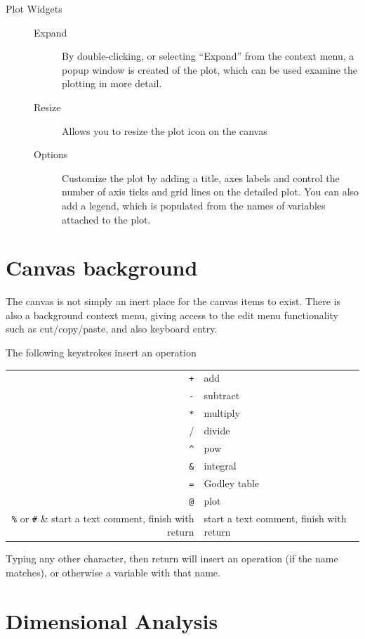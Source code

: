 \begin{description}
\item[Plot Widgets]\mbox{}
\begin{description}
\item[Expand]
By double-clicking, or selecting ``Expand'' from the context menu, a
popup window is created of the plot, which can be used examine the
plotting in more detail.

\item[Resize] Allows you to resize the plot icon on the canvas
\item[Options] Customize the plot by adding a title, axes labels and
  control the number of axis ticks and grid lines on the detailed
  plot. You can also add a legend, which is populated from the names
  of variables attached to the plot.
\end{description}

\end{description}

\section{Canvas background}

The canvas is not simply an inert place for the canvas items to
exist. There is also a background context menu, giving access to the
edit menu functionality such as cut/copy/paste, and also keyboard entry.

The following keystrokes insert an operation

\begin{tabular}{rl}
\verb-+- & add\\
\verb+-+ & subtract \\
\verb+*+ & multiply\\
\verb++/ & divide\\
\verb+^+ & pow\\
\verb+&+ & integral\\
\verb+=+ & Godley table\\
\verb+@+ & plot\\
\verb+%+ or \verb+#+ & start a text comment, finish with return\\
\end{tabular}

Typing any other character, then return will insert an operation (if
the name matches), or otherwise a variable with that name.

\section{Dimensional Analysis}

